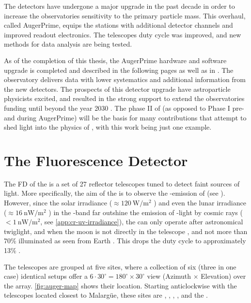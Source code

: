 The detectors have undergone a major upgrade in the past decade in order to 
increase the observatories sensitivity to the primary particle mass. This 
overhaul, called AugerPrime, equips the \SD stations with additional detector 
channels and improved readout electronics. The \FD telescopes duty cycle was 
improved, and new methods for data analysis are being tested.

As of the completion of this thesis, the AugerPrime hardware and software 
upgrade is completed and described in the following pages as well as in 
\cite{collaborationPierreAugerObservatory2011}. The observatory delivers data 
with lower systematics and additional information from the new detectors. The 
prospects of this detector upgrade have astroparticle physicists excited, and 
resulted in the strong support to extend the observatories funding until beyond
the year 2030 \cite{castellinaOutcomeFinanceBoard2023}. The phase II of \DAQ 
(as opposed to Phase I pre- and during AugerPrime) will be the basis for many 
contributions that attempt to shed light into the physics of \UHECRs, with this
work being just one example.

\section{The Fluorescence Detector}
\label{sec:fd}

The \acf{FD} of the \PAO is a set of 27 reflector telescopes tuned to detect 
faint sources of \UV light. More specifically, the aim of the \FD is to observe
the \UV-emission of \EAS (see ). However, since the 
solar irradiance ($\approx\SI{120}{\watt\per\meter\squared}$ 
\cite{leanContributionUltravioletIrradiance1989}) and even the lunar irradiance 
($\approx\SI{16}{\nano\watt\per\meter\squared}$
\cite{snowAbsoluteUltravioletIrradiance2013}) in the \UV-band far outshine the 
emission of \UV-light by cosmic rays ($<\SI{1}{\nano\watt\per\meter\squared}$, 
see \cref{app:cr-uv-irradiance}), the \FD can only operate after astronomical 
twiglight, and when the moon is not directly in the telescope \FOV, and not
more than 70\% illuminated as seen from Earth \cite{mathesCriteriaFDShift}. 
This drops the duty cycle to approximately 13\% 
\cite{abrahamFluorescenceDetectorPierre2010}.

The telescopes are grouped at five \FD sites, where a collection of six (three
in one case) identical setups offer a $6\cdot30^\circ=180^\circ\times30^\circ$ 
view (Azimuth $\times$ Elevation) over the \SD array. \cref{fig:auger-map} 
shows their location. Starting anticlockwise with the telescopes located 
closest to Malargüe, these sites are \LL, \LM, \LA, , and the \HEAT.


